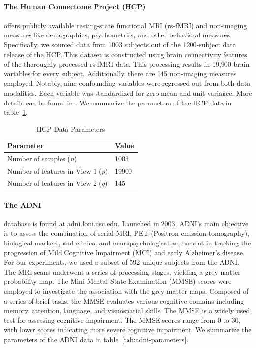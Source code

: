 \paragraph{The Human Connectome Project (HCP)} offers publicly available resting-state functional MRI (rs-fMRI) and non-imaging measures like demographics, psychometrics, and other behavioral measures.
Specifically, we sourced data from 1003 subjects out of the 1200-subject data release of the HCP.
This dataset is constructed using brain connectivity features of the thoroughly processed rs-fMRI data.
This processing results in 19,900 brain variables for every subject.
Additionally, there are 145 non-imaging measures employed.
Notably, nine confounding variables were regressed out from both data modalities.
Each variable was standardized for zero mean and unit variance.
More details can be found in \cite{smith2015positive, mihalik2022canonical}.
We summarize the parameters of the HCP data in table~\ref{tab:hcp-parameters}.

\begin{table}
\centering
\caption{HCP Data Parameters}
\begin{tabular}{| l | l |}
\hline
\textbf{Parameter} & \textbf{Value} \\
\hline
Number of samples (\textit{n}) & 1003 \\
Number of features in View 1 (\textit{p}) & 19900 \\
Number of features in View 2 (\textit{q}) & 145 \\
\hline
\end{tabular}\label{tab:hcp-parameters}
\end{table}

\paragraph{The ADNI} database is found at \url{adni.loni.usc.edu}.
Launched in 2003, ADNI's main objective is to assess the combination of serial MRI, PET (Positron emission tomography), biological markers, and clinical and neuropsychological assessment in tracking the progression of Mild Cognitive Impairment (MCI) and early Alzheimer’s disease.
For our experiments, we used a subset of 592 unique subjects from the ADNI. The MRI scans underwent a series of processing stages, yielding a grey matter probability map.
The Mini-Mental State Examination (MMSE) scores were employed to investigate the association with the grey matter maps.
Composed of a series of brief tasks, the MMSE evaluates various cognitive domains including memory, attention, language, and visuospatial skills.
The MMSE is a widely used test for assessing cognitive impairment.
The MMSE scores range from 0 to 30, with lower scores indicating more severe cognitive impairment.
We summarize the parameters of the ADNI data in table~\ref{tab:adni-parameters}.

